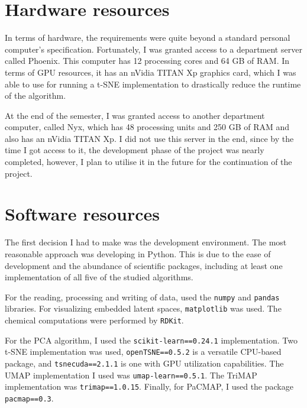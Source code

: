 \section{Hardware resources}\label{sec:hardware-resources}

In terms of hardware, the requirements were quite beyond a standard personal computer's specification. Fortunately, I was granted access to a department server called Phoenix. This computer has 12 processing cores and 64 GB of RAM. In terms of GPU resources, it has an nVidia TITAN Xp graphics card, which I was able to use for running a t-SNE implementation to drastically reduce the runtime of the algorithm.

At the end of the semester, I was granted access to another department computer, called Nyx, which has 48 processing units and 250 GB of RAM and also has an nVidia TITAN Xp. I did not use this server in the end, since by the time I got access to it, the development phase of the project was nearly completed, however, I plan to utilise it in the future for the continuation of the project.

\section{Software resources}\label{sec:software-resources}

The first decision I had to make was the development environment. The most reasonable approach was developing in Python. This is due to the ease of development and the abundance of scientific packages, including at least one implementation of all five of the studied algorithms. 

For the reading, processing and writing of data, used the \texttt{numpy} and \texttt{pandas} libraries. For visualizing embedded latent spaces, \texttt{matplotlib} was used. The chemical computations were performed by \texttt{RDKit}\cite{bib:rdkit}.

For the PCA algorithm, I used the \texttt{scikit-learn==0.24.1} implementation. Two t-SNE implementation was used, \texttt{openTSNE==0.5.2} is a versatile CPU-based package, and \texttt{tsnecuda==2.1.1} is one with GPU utilization capabilities. The UMAP implementation I used was \texttt{umap-learn==0.5.1}. The TriMAP implementation was \texttt{trimap==1.0.15}. Finally, for PaCMAP, I used the package \texttt{pacmap==0.3}.